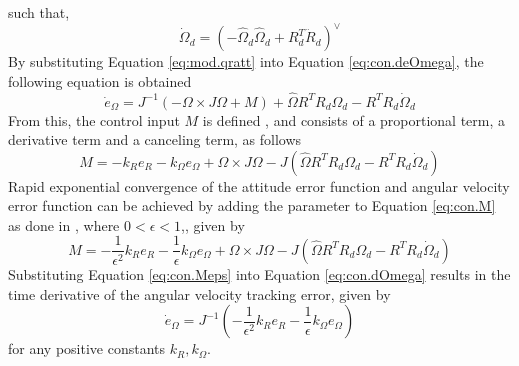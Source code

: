 such that,
\begin{equation}\label{eq:con.dOmegad}
\dot{\Omega}_d=(-\hat{\Omega}_d\hat{\Omega}_d+R_d^T\ddot{R}_d)^\vee 
\end{equation}
By substituting Equation \ref{eq:mod.qratt} into Equation \ref{eq:con.deOmega}, the following equation is obtained
\begin{equation}\label{eq:con.dOmega}
\dot{e}_\Omega=J^{-1}(-\Omega\times J\Omega + M)+\hat{\Omega}R^TR_d\Omega_d-R^TR_d\dot{\Omega}_d
\end{equation}
From this, the control input $ M $ is defined \cite{Lee2010c}, and consists of a proportional term, a derivative term and a canceling term, as follows
\begin{equation}\label{eq:con.M}
M = -k_Re_R-k_\Omega e_\Omega+\Omega\times J\Omega-J(\hat{\Omega}R^TR_d\Omega_d-R^TR_d\dot{\Omega}_d)
\end{equation}
Rapid exponential convergence of the attitude error function and angular velocity error function can be achieved by adding
the parameter  to
Equation \ref{eq:con.M}  as done in \cite{Sreenath2013c}, where $ 0<\epsilon<1 $,, given by
\begin{equation}\label{eq:con.Meps}
M = -\frac{1}{\epsilon^2}k_Re_R-\frac{1}{\epsilon}k_\Omega e_\Omega+\Omega\times J\Omega-J(\hat{\Omega}R^TR_d\Omega_d-R^TR_d\dot{\Omega}_d)
\end{equation}
Substituting Equation \ref{eq:con.Meps} into Equation \ref{eq:con.dOmega} results in the time derivative of the angular velocity tracking error, given by
\begin{equation}\label{eq:con.JdeOmega}
\dot{e}_\Omega=J^{-1}(-\frac{1}{\epsilon^2}k_Re_R-\frac{1}{\epsilon}k_\Omega e_\Omega)
\end{equation} 
for any positive constants $ k_R, k_\Omega $.\\
